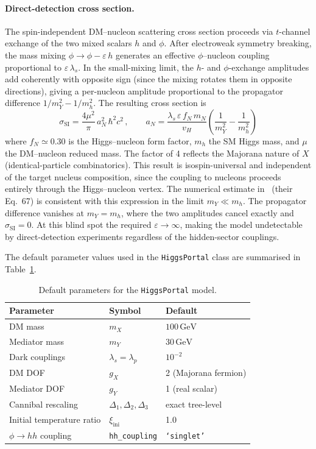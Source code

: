 \documentclass[11pt]{article}
\numberwithin{equation}{section}
\newcommand{\GeV}{\,\text{GeV}}
\newcommand{\mX}{m_X}
\newcommand{\mY}{m_Y}
\newcommand{\epsX}{\varepsilon}
\begin{document}
\paragraph{Direct-detection cross section.}
The spin-independent DM--nucleon scattering cross section proceeds via $t$-channel exchange of the two mixed scalars $h$ and $\phi$. After electroweak symmetry breaking, the mass mixing $\phi \to \phi - \epsX\,h$ generates an effective $\phi$--nucleon coupling proportional to $\epsX\,\lambda_s$. In the small-mixing limit, the $h$- and $\phi$-exchange amplitudes add coherently with opposite sign (since the mixing rotates them in opposite directions), giving a per-nucleon amplitude proportional to the propagator difference $1/\mY^2 - 1/m_h^2$. The resulting cross section is
\begin{equation}
    \sigma_{\text{SI}} = \frac{4\mu^2}{\pi}\,a_N^2\,\hbar^2 c^2\,, \qquad
    a_N = \frac{\lambda_s\,\epsX\,f_N\,m_N}{v_H}\left(\frac{1}{\mY^2} - \frac{1}{m_h^2}\right)
    \label{eq:HP_sigma_SI}
\end{equation}
where $f_N \simeq 0.30$ is the Higgs--nucleon form factor, $m_h$ the SM Higgs mass, and $\mu$ the DM--nucleon reduced mass. The factor of 4 reflects the Majorana nature of $X$ (identical-particle combinatorics). This result is isospin-universal and independent of the target nucleus composition, since the coupling to nucleons proceeds entirely through the Higgs--nucleon vertex. The numerical estimate in~\cite{Berlin:2016gtr} (their Eq.~67) is consistent with this expression in the limit $\mY \ll m_h$. The propagator difference vanishes at $\mY = m_h$, where the two amplitudes cancel exactly and $\sigma_{\text{SI}} = 0$. At this blind spot the required $\epsX \to \infty$, making the model undetectable by direct-detection experiments regardless of the hidden-sector couplings.

The default parameter values used in the \texttt{HiggsPortal} class are summarised in Table~\ref{tab:HP_defaults}.
\begin{table}[h]
\centering
\begin{tabular}{lll}
\toprule
Parameter & Symbol & Default \\
\midrule
DM mass & $\mX$ & $100\GeV$ \\
Mediator mass & $\mY$ & $30\GeV$ \\
Dark couplings & $\lambda_s = \lambda_p$ & $10^{-2}$ \\
DM DOF & $g_X$ & 2 (Majorana fermion) \\
Mediator DOF & $g_Y$ & 1 (real scalar) \\
Cannibal rescaling & $\Delta_1, \Delta_2, \Delta_3$ & exact tree-level \\
Initial temperature ratio & $\xi_{\text{ini}}$ & 1.0 \\
$\phi\to hh$ coupling & \texttt{hh\_coupling} & \texttt{`singlet'} \\
\bottomrule
\end{tabular}
\caption{Default parameters for the \texttt{HiggsPortal} model.}
\label{tab:HP_defaults}
\end{table}
\end{document}
